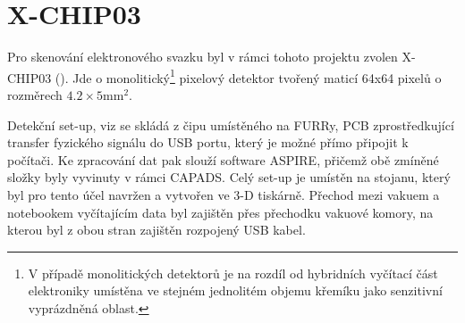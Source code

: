 \section{X-CHIP03}
Pro skenování elektronového svazku byl v rámci tohoto projektu zvolen X-CHIP03 (). Jde o monolitický\footnote{V případě monolitických detektorů je na rozdíl od hybridních vyčítací část elektroniky umístěna ve stejném jednolitém objemu křemíku jako senzitivní vyprázdněná oblast.} pixelový detektor tvořený maticí 64x64 pixelů o rozměrech $4.2\times 5 \mathrm{mm}^2$. 


Detekční set-up, viz  se skládá z čipu umístěného na FURRy, PCB zprostředkující transfer fyzického signálu do USB portu, který je možné přímo připojit k počítači. Ke zpracování dat pak slouží software ASPIRE, přičemž obě zmíněné složky byly vyvinuty v rámci CAPADS. Celý set-up je umístěn na stojanu, který byl pro tento účel navržen a vytvořen ve 3-D tiskárně. Přechod mezi vakuem a notebookem vyčítajícím data byl zajištěn přes přechodku vakuové komory, na kterou byl z obou stran zajištěn rozpojený USB kabel.


\label{chapter2}

\clearpage \pagebreak \newpage